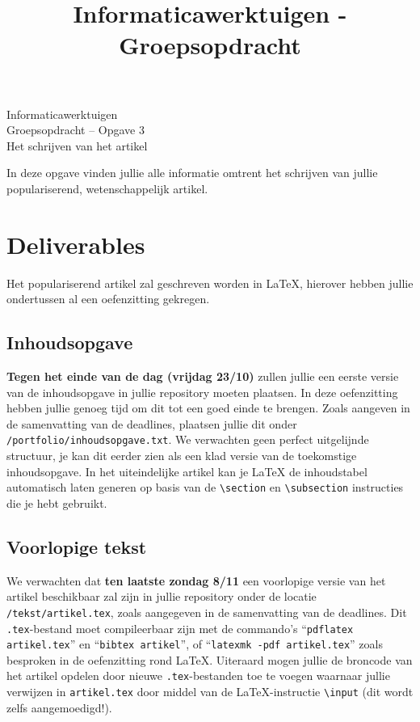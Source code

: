 \documentclass[a4paper]{article}
\title{Informaticawerktuigen - Groepsopdracht}
\begin{document}
\begin{center}
  \huge Informaticawerktuigen \\
  \Huge Groepsopdracht -- Opgave 3 \\
  \huge Het schrijven van het artikel
\end{center}
\vspace{1em}

In deze opgave vinden jullie alle informatie omtrent het schrijven van jullie populariserend, wetenschappelijk artikel.


\section{Deliverables}

Het populariserend artikel zal geschreven worden in \LaTeX{}, hierover hebben jullie ondertussen al een oefenzitting gekregen.

\subsection{Inhoudsopgave}

\textbf{Tegen het einde van de dag (vrijdag 23/10)} zullen jullie een eerste versie van de inhoudsopgave in jullie repository moeten plaatsen.
In deze oefenzitting hebben jullie genoeg tijd om dit tot een goed einde te brengen.
Zoals aangeven in de samenvatting van de deadlines, plaatsen jullie dit onder \texttt{/portfolio/inhoudsopgave.txt}.
We verwachten geen perfect uitgelijnde structuur, je kan dit eerder zien als een klad versie van de toekomstige inhoudsopgave.
In het uiteindelijke artikel kan je \LaTeX{} de inhoudstabel automatisch laten generen op basis van de \texttt{\textbackslash section} en \texttt{\textbackslash subsection} instructies die je hebt gebruikt.


\subsection{Voorlopige tekst}

We verwachten dat \textbf{ten laatste zondag 8/11} een voorlopige versie van het artikel beschikbaar zal zijn in jullie repository onder de locatie \texttt{/tekst/artikel.tex}, zoals aangegeven in de samenvatting van de deadlines.
Dit \texttt{.tex}-bestand moet compileerbaar zijn met de commando's ``\texttt{pdflatex artikel.tex}'' en ``\texttt{bibtex artikel}'', of ``\texttt{latexmk -pdf artikel.tex}'' zoals besproken in de oefenzitting rond \LaTeX{}.
Uiteraard mogen jullie de broncode van het artikel opdelen door nieuwe \texttt{.tex}-bestanden toe te voegen waarnaar jullie verwijzen in \texttt{artikel.tex} door middel van de \LaTeX{}-instructie \texttt{\textbackslash input} (dit wordt zelfs aangemoedigd!).
\end{document}
